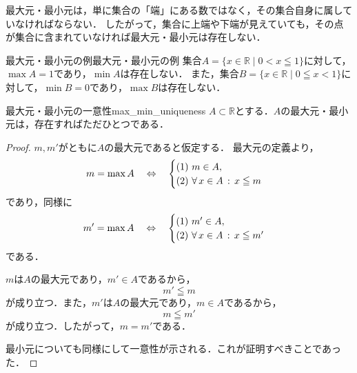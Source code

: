 最大元・最小元は，単に集合の「端」にある数ではなく，その集合自身に属していなければならない．
したがって，集合に上端や下端が見えていても，その点が集合に含まれていなければ最大元・最小元は存在しない．

\begin{example}{最大元・最小元の例}{最大元・最小元の例}
  集合$A = \{x \in \mathbb{R} \mid 0 < x \leqq 1\}$に対して，$\max A = 1$であり，$\min A$は存在しない．
  また，集合$B = \{x \in \mathbb{R} \mid 0 \leqq x < 1\}$に対して，$\min B = 0$であり，$\max B$は存在しない．
\end{example}

\begin{prop}{最大元・最小元の一意性}{max_min_uniqueness}
  $A \subset \mathbb{R}$とする．$A$の最大元・最小元は，存在すればただひとつである．
\end{prop}

\begin{tleftbar}
  \begin{proof}
    $m,m'$がともに$A$の最大元であると仮定する．
    最大元の定義より，
    \[
      m = \max A
      \quad\mathrel{\Leftrightarrow}\quad
      \begin{cases}
        \textup{(1)}\ m \in A,\\
        \textup{(2)}\ \forall\, x \in A \,:\, x \leqq m
      \end{cases}
    \]
    であり，同様に
    \[
      m' = \max A
      \quad\mathrel{\Leftrightarrow}\quad
      \begin{cases}
        \textup{(1)}\ m' \in A,\\
        \textup{(2)}\ \forall\, x \in A \,:\, x \leqq m'
      \end{cases}
    \]
    である．

    $m$は$A$の最大元であり，$m' \in A$であるから，
    \[
      m' \leqq m
    \]
    が成り立つ．また，$m'$は$A$の最大元であり，$m \in A$であるから，
    \[
      m \leqq m'
    \]
    が成り立つ．したがって，$m = m'$である．

    最小元についても同様にして一意性が示される．これが証明すべきことであった．
  \end{proof}
\end{tleftbar}

